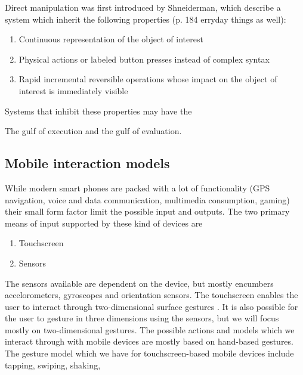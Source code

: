 Direct manipulation was first introduced by Shneiderman, which describe a system which inherit the following properties (p. 184 erryday things as well):

\begin{enumerate}
  \item Continuous representation of the object of interest
  \item Physical actions or labeled button presses instead of complex syntax
  \item Rapid incremental reversible operations whose impact on the object of interest is immediately visible
\end{enumerate}

Systems that inhibit these properties may have the

The gulf of execution and the gulf of evaluation.

\subsection{Mobile interaction models} %
While modern smart phones are packed with a lot of functionality (GPS navigation, voice and data communication, multimedia consumption, gaming) their small form factor limit the possible input and outputs. The two primary means of input supported by these kind of devices are
\begin{enumerate}
  \item Touchscreen
  \item Sensors
\end{enumerate}
The sensors available are dependent on the device, but mostly encumbers accelorometers, gyroscopes and orientation sensors. The touchscreen enables the user to interact through two-dimensional surface gestures \cite{Ruiz2011}. It is also possible for the user to gesture in three dimensions using the sensors, but we will focus mostly on two-dimensional gestures.
The possible actions and models which we interact through with mobile devices are mostly based on hand-based gestures. The gesture model which we have for touchscreen-based mobile devices include tapping, swiping, shaking,




